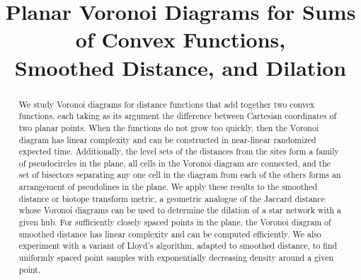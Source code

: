 \documentclass[10pt, conference, compsocconf]{IEEEtran}
\begin{document}
\title{Planar Voronoi Diagrams for  Sums of Convex Functions,\\ Smoothed Distance, and Dilation} 

\author{
\and
{}
\and
{}
}

\maketitle

\begin{abstract}
We study Voronoi diagrams for distance functions that add together two convex functions, each taking as its argument the difference between Cartesian coordinates of two planar points. When the functions do not grow too quickly, then the Voronoi diagram has linear complexity and can be constructed in near-linear randomized expected time. Additionally, the level sets of the distances from the sites  form a family of pseudocircles in the plane, all cells in the Voronoi diagram are connected, and the set of bisectors separating any one cell in the diagram from each of the others forms an arrangement of pseudolines in the plane. We apply these results to the smoothed distance or biotope transform metric, a geometric analogue of the Jaccard distance whose Voronoi diagrams can be used to determine the dilation of a star network with a given hub. For sufficiently closely spaced points in the plane, the Voronoi diagram of smoothed distance has linear complexity and can be computed efficiently. We also experiment with a variant of Lloyd's algorithm, adapted to smoothed distance, to find uniformly spaced point samples with exponentially decreasing density around a given point.
\end{abstract}
\end{document}
